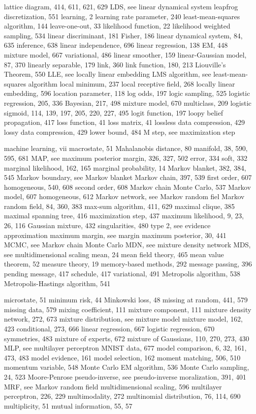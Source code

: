 \documentclass[
  10
]{article}
\begin{document}
lattice diagram, 414, 611, 621, 629 LDS, see linear dynamical system
leapfrog discretization, 551 learning, 2 learning rate parameter, 240
least-mean-squares algorithm, 144 leave-one-out, 33 likelihood function,
22 likelihood weighted sampling, 534 linear discriminant, 181 Fisher,
186 linear dynamical system, 84, 635 inference, 638 linear independence,
696 linear regression, 138 EM, 448 mixture model, 667 variational, 486
linear smoother, 159 linear-Gaussian model, 87, 370 linearly separable,
179 link, 360 link function, 180, 213 Liouville's Theorem, 550 LLE, see
locally linear embedding LMS algorithm, see least-mean-squares algorithm
local minimum, 237 local receptive field, 268 locally linear embedding,
596 location parameter, 118 log odds, 197 logic sampling, 525 logistic
regression, 205, 336 Bayesian, 217, 498 mixture model, 670 multiclass,
209 logistic sigmoid, 114, 139, 197, 205, 220, 227, 495 logit function,
197 loopy belief propagation, 417 loss function, 41 loss matrix, 41
lossless data compression, 429 lossy data compression, 429 lower bound,
484 M step, see maximization step

machine learning, vii macrostate, 51 Mahalanobis distance, 80 manifold,
38, 590, 595, 681 MAP, see maximum posterior margin, 326, 327, 502
error, 334 soft, 332 marginal likelihood, 162, 165 marginal probability,
14 Markov blanket, 382, 384, 545 Markov boundary, see Markov blanket
Markov chain, 397, 539 first order, 607 homogeneous, 540, 608 second
order, 608 Markov chain Monte Carlo, 537 Markov model, 607 homogeneous,
612 Markov network, see Markov random fiel Markov random field, 84, 360,
383 max-sum algorithm, 411, 629 maximal clique, 385 maximal spanning
tree, 416 maximization step, 437 maximum likelihood, 9, 23, 26, 116
Gaussian mixture, 432 singularities, 480 type 2, see evidence
approximation maximum margin, see margin maximum posterior, 30, 441
MCMC, see Markov chain Monte Carlo MDN, see mixture density network MDS,
see multidimensional scaling mean, 24 mean field theory, 465 mean value
theorem, 52 measure theory, 19 memory-based methods, 292 message
passing, 396 pending message, 417 schedule, 417 variational, 491
Metropolis algorithm, 538 Metropolis-Hastings algorithm, 541

microstate, 51 minimum risk, 44 Minkowski loss, 48 missing at random,
441, 579 missing data, 579 mixing coefficient, 111 mixture component,
111 mixture density network, 272, 673 mixture distribution, see mixture
model mixture model, 162, 423 conditional, 273, 666 linear regression,
667 logistic regression, 670 symmetries, 483 mixture of experts, 672
mixture of Gaussians, 110, 270, 273, 430 MLP, see multilayer perceptron
MNIST data, 677 model comparison, 6, 32, 161, 473, 483 model evidence,
161 model selection, 162 moment matching, 506, 510 momentum variable,
548 Monte Carlo EM algorithm, 536 Monte Carlo sampling, 24, 523
Moore-Penrose pseudo-inverse, see pseudo-inverse moralization, 391, 401
MRF, see Markov random field multidimensional scaling, 596 multilayer
perceptron, 226, 229 multimodality, 272 multinomial distribution, 76,
114, 690 multiplicity, 51 mutual information, 55, 57
\end{document}
